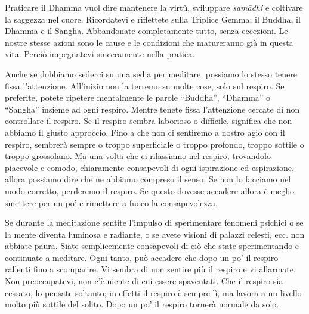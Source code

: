 Praticare il Dhamma vuol dire mantenere la virtù, sviluppare \emph{samādhi} e
coltivare la saggezza nel cuore. Ricordatevi e riflettete sulla Triplice
Gemma: il Buddha, il Dhamma e il Sangha. Abbandonate completamente
tutto, senza eccezioni. Le nostre stesse azioni sono le cause e le
condizioni che matureranno già in questa vita. Perciò impegnatevi
sinceramente nella pratica.

Anche se dobbiamo sederci su una sedia per meditare, possiamo lo stesso
tenere fissa l'attenzione. All'inizio non la terremo su molte cose, solo
sul respiro. Se preferite, potete ripetere mentalmente le parole
``Buddha'', ``Dhamma'' o ``Sangha'' insieme ad ogni respiro. Mentre
tenete fissa l'attenzione cercate di non controllare il respiro. Se il
respiro sembra laborioso o difficile, significa che non abbiamo il
giusto approccio. Fino a che non ci sentiremo a nostro agio con il
respiro, sembrerà sempre o troppo superficiale o troppo profondo, troppo
sottile o troppo grossolano. Ma una volta che ci rilassiamo nel respiro,
trovandolo piacevole e comodo, chiaramente consapevoli di ogni
ispirazione ed espirazione, allora possiamo dire che ne abbiamo compreso
il senso. Se non lo facciamo nel modo corretto, perderemo il respiro. Se
questo dovesse accadere allora è meglio smettere per un po' e rimettere
a fuoco la consapevolezza.

Se durante la meditazione sentite l'impulso di sperimentare fenomeni
psichici o se la mente diventa luminosa e radiante, o se avete visioni
di palazzi celesti, ecc. non abbiate paura. Siate semplicemente
consapevoli di ciò che state sperimentando e continuate a meditare. Ogni
tanto, può accadere che dopo un po' il respiro rallenti fino a
scomparire. Vi sembra di non sentire più il respiro e vi allarmate. Non
preoccupatevi, non c'è niente di cui essere spaventati. Che il respiro
sia cessato, lo pensate soltanto; in effetti il respiro è sempre lì, ma
lavora a un livello molto più sottile del solito. Dopo un po' il respiro
tornerà normale da solo.

